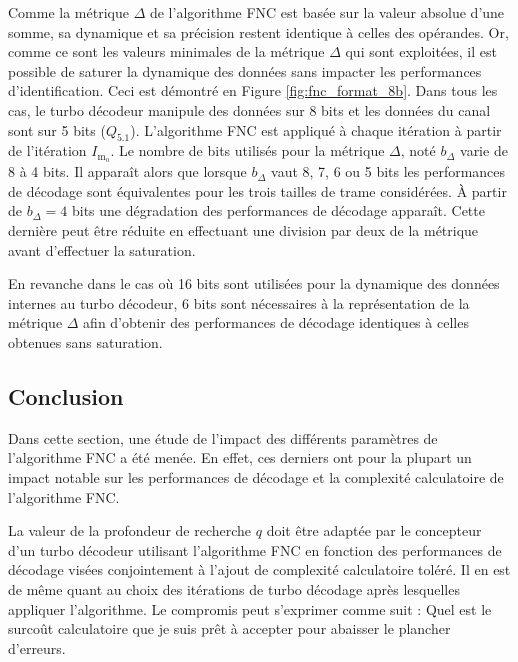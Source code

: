 Comme la métrique $\Delta$ de l'algorithme FNC est basée sur la valeur absolue d'une somme, sa dynamique et sa précision restent identique 
à celles des opérandes. Or, comme ce sont les valeurs minimales de la métrique $\Delta$ qui sont exploitées, il est possible de 
saturer la dynamique des données sans impacter les performances d'identification. Ceci est démontré en Figure 
\ref{fig:fnc_format_8b}. Dans tous les cas, le turbo décodeur manipule des données sur 8 bits et les données du canal 
sont sur 5 bits ($Q_{5.1}$). L'algorithme FNC est appliqué à chaque itération à partir de l'itération $I_{\text{m}_\text{o}}$. Le 
nombre de bits utilisés pour la métrique $\Delta$, noté $b_{\Delta}$ varie de 8 à 4 bits. Il 
apparaît alors que lorsque $b_{\Delta}$ vaut 8, 7, 6 ou 5 bits les performances de décodage sont équivalentes pour les trois tailles de trame considérées. À partir de $b_{\Delta} = 4$ bits une dégradation des 
performances de décodage apparaît. Cette dernière peut être réduite en effectuant une division par deux de la métrique
avant d'effectuer la saturation. 

En revanche dans le cas où 16 bits sont utilisées pour la dynamique des données internes au turbo décodeur, 6 bits sont 
nécessaires à la représentation de la métrique $\Delta$ afin d'obtenir des performances de décodage identiques à celles obtenues sans saturation.




\subsection{Conclusion}
Dans cette section, une étude de l'impact des différents paramètres de l'algorithme FNC a été menée. En effet, ces derniers ont
pour la plupart un impact notable sur les performances de décodage et la complexité calculatoire de l'algorithme FNC. 

La valeur de la profondeur de recherche $q$ doit être adaptée par le concepteur d'un turbo décodeur utilisant l'algorithme 
FNC en fonction des performances de décodage visées conjointement à l'ajout de complexité calculatoire toléré. Il en est de même 
quant au choix des itérations de turbo décodage après lesquelles appliquer l'algorithme. Le compromis peut s'exprimer comme
suit : \og Quel est le surcoût calculatoire que je suis prêt à accepter pour abaisser le plancher d'erreurs. \fg

